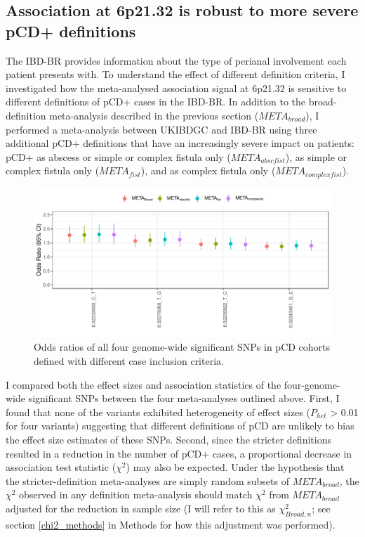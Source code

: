     \subsection{Association at 6p21.32 is robust to more severe pCD+ definitions}


The IBD-BR provides information about the type of perianal involvement each patient presents with. To understand the effect of different definition criteria, I investigated how the meta-analysed association signal at 6p21.32 is sensitive to different definitions of pCD+ cases in the IBD-BR. In addition to the broad-definition meta-analysis described in the previous section ($META_{broad}$), I performed a meta-analysis between UKIBDGC and IBD-BR using three additional pCD+ definitions that have an increasingly severe impact on patients: pCD+ as abscess or simple or complex fistula only ($META_{abscfist}$), as simple or complex fistula only ($META_{fist}$), and as complex fistula only ($META_{complexfist}$). 

\begin{figure}[H] 
  \centering    
  \includegraphics[width=1.0\textwidth]{pcd_def_or_plot}
  \caption[Effect sizes of genome-wide significant SNPs with different pCD definitions]{Odds ratios of all four genome-wide significant SNPs in pCD cohorts defined with different case inclusion criteria.}
  \label{fig:pcd_def_or_plot}
  \end{figure}


I compared both the effect sizes and association statistics of the four-genome-wide significant SNPs between the four meta-analyses outlined above. First, I found that none of the variants exhibited heterogeneity of effect sizes ($P_{het}$ > 0.01 for four variants) suggesting that different definitions of pCD are unlikely to bias the effect size estimates of these SNPs. Second, since the stricter definitions resulted in a reduction in the number of pCD+ cases, a proportional decrease in association test statistic ($\chi^{2}$) may also be expected. Under the hypothesis that the stricter-definition meta-analyses are simply random subsets of $META_{broad}$, the $\chi^{2}$  observed in any definition meta-analysis should match $\chi^{2}$ from $META_{broad}$ adjusted for the reduction in sample size (I will refer to this as $\chi^{2}_{Broad,n}$; see section \ref{chi2_methods} in Methods for how this adjustment was performed). \\

